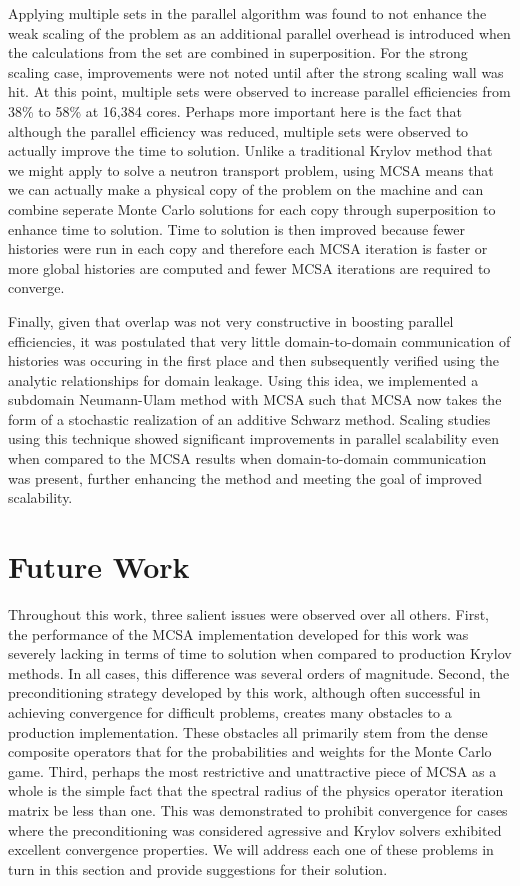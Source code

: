 Applying multiple sets in the parallel algorithm was found to not
enhance the weak scaling of the problem as an additional parallel
overhead is introduced when the calculations from the set are combined
in superposition. For the strong scaling case, improvements were not
noted until after the strong scaling wall was hit. At this point,
multiple sets were observed to increase parallel efficiencies from
38\% to 58\% at 16,384 cores. Perhaps more important here is the fact
that although the parallel efficiency was reduced, multiple sets were
observed to actually improve the time to solution. Unlike a
traditional Krylov method that we might apply to solve a neutron
transport problem, using MCSA means that we can actually make a
physical copy of the problem on the machine and can combine seperate
Monte Carlo solutions for each copy through superposition to enhance
time to solution. Time to solution is then improved because fewer
histories were run in each copy and therefore each MCSA iteration is
faster or more global histories are computed and fewer MCSA iterations
are required to converge.

Finally, given that overlap was not very constructive in boosting
parallel efficiencies, it was postulated that very little
domain-to-domain communication of histories was occuring in the first
place and then subsequently verified using the analytic relationships
for domain leakage. Using this idea, we implemented a subdomain
Neumann-Ulam method with MCSA such that MCSA now takes the form of a
stochastic realization of an additive Schwarz method. Scaling studies
using this technique showed significant improvements in parallel
scalability even when compared to the MCSA results when
domain-to-domain communication was present, further enhancing the
method and meeting the goal of improved scalability.

\section{Future Work\ }
\label{sec:future_work}

Throughout this work, three salient issues were observed over all
others. First, the performance of the MCSA implementation developed
for this work was severely lacking in terms of time to solution when
compared to production Krylov methods. In all cases, this difference
was several orders of magnitude. Second, the preconditioning strategy
developed by this work, although often successful in achieving
convergence for difficult problems, creates many obstacles to a
production implementation. These obstacles all primarily stem from the
dense composite operators that for the probabilities and weights for
the Monte Carlo game. Third, perhaps the most restrictive and
unattractive piece of MCSA as a whole is the simple fact that the
spectral radius of the physics operator iteration matrix be less than
one. This was demonstrated to prohibit convergence for cases where the
preconditioning was considered agressive and Krylov solvers exhibited
excellent convergence properties. We will address each one of these
problems in turn in this section and provide suggestions for their
solution.


